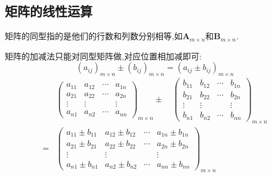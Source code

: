 \subsection{矩阵的线性运算}
\begin{formal}
\begin{definition}[同型]\label{def:同型}
    矩阵的同型指的是他们的行数和列数分别相等,如$
\bm{A}_{m\times n}$和$\bm{B}_{m\times n}$.
\end{definition}
\end{formal}
\begin{formal}
\begin{definition}[加法和减法]\label{def:加法和减法}
矩阵的加减法只能对同型矩阵做,对应位置相加减即可:
\[
    \left(a_{ij}\right)_{m \times n} \pm \left(
        b_{ij}
    \right)_{m \times n} = \left(
        a_{ij} \pm b_{ij}
    \right)_{m \times n}
\]
\begin{align*}
    &\begin{pmatrix}
        a_{11} &a_{12}&\cdots&a_{1n}\\
         a_{21} &a_{22}&\cdots&a_{2n}\\
            \vdots&\vdots&&\vdots\\
            a_{n1}&a_{n2}&\cdots&a_{nn}
    \end{pmatrix}_{m \times n}
    \pm
    \quad
    \begin{pmatrix}
        b_{11}  &b_{12}&\cdots&b_{1n}\\
         b_{21} &b_{22}&\cdots&b_{2n}\\
            \vdots&\vdots&&\vdots\\
            b_{n1}&b_{n2}&\cdots&b_{nn}
    \end{pmatrix}_{m \times n}
   \\
   =&
    \begin{pmatrix}
        a_{11} \pm b_{11} &a_{12}\pm b_{12}&\cdots&a_{1n}\pm b_{1n}\\
         a_{21} \pm b_{21} &a_{22}\pm b_{22}&\cdots&a_{2n}\pm b_{2n}\\
            \vdots&\vdots&&\vdots\\
            a_{n1}\pm b_{n1}&a_{n2}\pm b_{n2}&\cdots&a_{nn}\pm b_{nn}
    \end{pmatrix}_{m \times n}
\end{align*}
\end{definition}
\end{formal}
